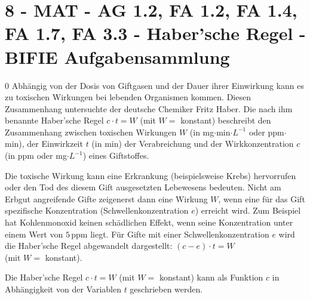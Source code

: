 \section{8 - MAT - AG 1.2, FA 1.2, FA 1.4, FA 1.7, FA 3.3 - Haber'sche Regel - BIFIE Aufgabensammlung}

\begin{langesbeispiel} \item[0] %
Abhängig  von  der  Dosis  von  Giftgasen  und  der  Dauer  ihrer  Einwirkung  kann  es  zu  toxischen  Wirkungen bei lebenden Organismen kommen. Diesen Zusammenhang untersuchte der deutsche Chemiker Fritz Haber. Die nach ihm benannte Haber'sche Regel $c\cdot t=W$ (mit $W=$ konstant) beschreibt den Zusammenhang zwischen toxischen Wirkungen $W$ (in mg$\cdot$min$\cdot L^{-1}$ oder ppm$\cdot$min),  der  Einwirkzeit $t$ (in  min)  der  Verabreichung  und  der  Wirkkonzentration $c$ (in ppm oder mg$\cdot L^{-1}$) eines Giftstoffes.  
				
Die  toxische  Wirkung  kann  eine  Erkrankung  (beispielsweise  Krebs)  hervorrufen  oder  den  Tod  des diesem Gift ausgesetzten Lebewesens bedeuten. Nicht am Erbgut angreifende Gifte zeigenerst dann  eine  Wirkung $W$,  wenn  eine  für  das  Gift  spezifische  Konzentration  (Schwellenkonzentration $e$) erreicht  wird. Zum  Beispiel  hat  Kohlenmonoxid  keinen  schädlichen  Effekt,  wenn seine Konzentration unter einem Wert von $5\,$ppm liegt. Für Gifte mit einer Schwellenkonzentration $e$ wird die Haber'sche Regel abgewandelt dargestellt: $(c-e)\cdot t=W$\\
(mit $W=$ konstant). %

\begin{aufgabenstellung}
\item Die Haber'sche Regel $c\cdot t=W$ (mit $W=$ konstant) kann als Funktion $c$ in Abhängigkeit von der Variablen $t$ geschrieben werden.%

\end{aufgabenstellung}
\end{langesbeispiel}
